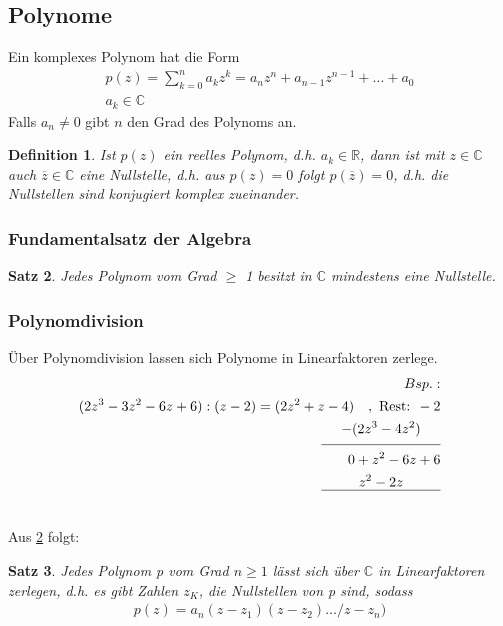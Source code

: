 \documentclass[12pt,a4paper]{article}%
\newtheorem{satz}{Satz}[section]
\newtheorem{definition}[satz]{Definition}
\numberwithin{equation}{section}
\newcommand{\R}{\mathbb{R}} %
\newcommand{\C}{\mathbb{C}}
\numberwithin{equation}{subsection}
\begin{document}
  \subsection{Polynome}
  Ein komplexes Polynom hat die Form
  \begin{align}
    p(z) = \sum_{k=0}^n a_k z^k = a_n z^n + a_{n-1} z^{n-1} + ... + a_0 \\
    a_k \in \C \nonumber
  \end{align}
  Falls $a_n \neq 0$ gibt $n$ den Grad des Polynoms an.
  \newline
  \begin{definition} 
    \glqq Ist $p(z)$ ein reelles Polynom, d.h. $a_k \in \R$, dann ist mit $z\in \C$ auch 
  $\overline{z} \in \C$ eine Nullstelle, d.h. aus $p(z) = 0$ folgt $p(\overline{z}) = 0$, d.h. die
  Nullstellen sind konjugiert komplex zueinander. \grqq \cite{HM12}
  \end{definition}

	\subsubsection{Fundamentalsatz der Algebra}
	\begin{satz}
	  Jedes Polynom vom Grad $\geq$ 1 besitzt in $\C$ mindestens eine Nullstelle.     
	  \label{satz:fund_alg}
	\end{satz}
	  
  \subsubsection{Polynomdivision}
    Über Polynomdivision lassen sich Polynome in Linearfaktoren zerlege. 
    \begin{align}
      Bsp.:  \nonumber\\
      (2z^3 - 3z^2 -6z +6) : (z-2) = (2z^2 +z -4)\quad ,\text{ Rest: } -2 \nonumber\\
      \underset{\text{\rule{3cm}{0.4pt}}}{-(2z^3 - 4z^2)} \nonumber \\
      0 + z^2 - 6z + 6 \nonumber \\
      \qquad \underset{\text{\rule[5mm]{3cm}{0.4pt}}}{z^2-2z} \nonumber \\
    \end{align}
    
    Aus \ref{satz:fund_alg} folgt:
    \begin{satz}
      Jedes Polynom p vom Grad $n\geq 1$ lässt sich über $\C$ in Linearfaktoren zerlegen, d.h. es gibt Zahlen $z_K$, die Nullstellen von p sind, sodass
      \begin{align*}
        p(z) = a_n(z-z_1)(z-z_2).../z-z_n)
      \end{align*}
    \end{satz}
    
\end{document}
